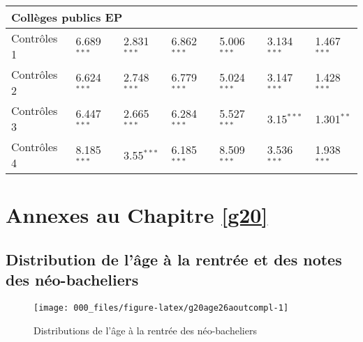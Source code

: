 \documentclass[
]{book}
\begin{document}
\begin{ThreePartTable}
\begin{longtable}[t]{lllllll}
\multicolumn{7}{l}{\textbf{Collèges publics EP}}\\
\hline
\hspace{1em}Contrôles 1 & 6.689$^{***}$ & 2.831$^{***}$ & 6.862$^{***}$ & 5.006$^{***}$ & 3.134$^{***}$ & 1.467$^{***}$\\
\hspace{1em}Contrôles 2 & 6.624$^{***}$ & 2.748$^{***}$ & 6.779$^{***}$ & 5.024$^{***}$ & 3.147$^{***}$ & 1.428$^{***}$\\
\hspace{1em}Contrôles 3 & 6.447$^{***}$ & 2.665$^{***}$ & 6.284$^{***}$ & 5.527$^{***}$ & 3.15$^{***}$ & 1.301$^{**}$\\
\hspace{1em}Contrôles 4 & 8.185$^{***}$ & 3.55$^{***}$ & 6.185$^{***}$ & 8.509$^{***}$ & 3.536$^{***}$ & 1.938$^{***}$\\*
\end{longtable}
\end{ThreePartTable}
\endgroup{}

\hypertarget{annexes-au-chapitre-refg20}{%
\chapter*{Annexes au Chapitre \ref{g20}}\label{annexes-au-chapitre-refg20}}

\setcounter{section}{0}

\renewcommand*{\theHchapter}{\thechapter}
\renewcommand*{\thesection}{\Alph{section}}
\renewcommand*{\theHsection}{Appendix.\thechapter\thesection}

\renewcommand*{\thetable}{\Alph{section}.\arabic{table}}
\renewcommand*{\theHtable}{Appendix.\thetable}

\renewcommand*{\thefigure}{\Alph{section}.\arabic{figure}}
\renewcommand*{\theHfigure}{Appendix.\thefigure}

\setcounter{table}{0}
\setcounter{figure}{0}

\hypertarget{g20age26aoutnotescompl}{%
\section{Distribution de l'âge à la rentrée et des notes des néo-bacheliers}\label{g20age26aoutnotescompl}}

\begin{figure}[H]

{\centering \texttt{[image: 000\_files/figure-latex/g20age26aoutcompl-1]} 

}

\caption{Distributions de l'âge à la rentrée des néo-bacheliers}\label{fig:g20age26aoutcompl}
\end{figure}
\end{document}
